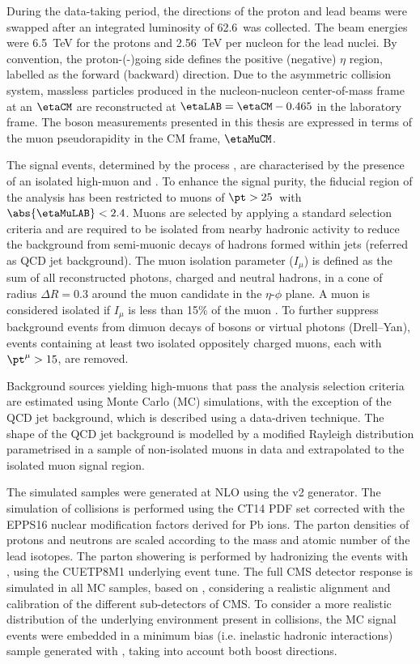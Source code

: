 During the data-taking period, the directions of the proton and lead beams were swapped after an integrated luminosity of 62.6~\nbinv was collected. The beam energies were \SI{6.5}{\TeV} for the protons and \SI{2.56}{\TeV} per nucleon for the lead nuclei. By convention, the proton-(\Pb-)going side defines the positive (negative) $\eta$ region, labelled as the forward (backward) direction. Due to the asymmetric collision system, massless particles produced in the nucleon-nucleon center-of-mass frame at an $\etaCM$ are reconstructed at $\etaLAB = \etaCM - 0.465$ in the laboratory frame. The {\PWpm} boson measurements presented in this thesis are expressed in terms of the muon pseudorapidity in the CM frame, $\etaMuCM$.

The signal events, determined by the process \WToMuNupm, are characterised by the presence of an isolated high-\pt muon and \ptmiss. To enhance the signal purity, the fiducial region of the analysis has been restricted to muons of $\pt > 25$~\GeVc with $\abs{\etaMuLAB} < 2.4$. Muons are selected by applying a standard selection criteria and are required to be isolated from nearby hadronic activity to reduce the background from semi-muonic decays of hadrons formed within jets (referred as QCD jet background). The muon isolation parameter ($I_{\mu}$) is defined as the \pt sum of all reconstructed photons, charged and neutral hadrons, in a cone of radius $\Delta{R} = 0.3$ around the muon candidate in the $\eta$-$\phi$ plane. A muon is considered isolated if $I_{\mu}$ is less than 15\% of the muon \pt. To further suppress background events from dimuon decays of \Z bosons or virtual photons (Drell--Yan), events containing at least two isolated oppositely charged muons, each with $\pt^{\mu} > 15$\GeVc, are removed.

Background sources yielding high-\pt muons that pass the analysis selection criteria are estimated using Monte Carlo (MC) simulations, with the exception of the QCD jet background, which is described using a  data-driven technique. The \ptmiss shape of the QCD jet background is modelled by a modified Rayleigh distribution parametrised in a sample of non-isolated muons in data and extrapolated to the isolated muon signal region.

The simulated samples were generated at NLO using the \POWHEG v2 generator. The simulation of \pPb collisions is performed using the CT14 PDF set corrected with the EPPS16 nuclear modification factors derived for Pb ions. The parton densities of protons and neutrons are scaled according to the mass and atomic number of the lead isotopes. The parton showering is performed by hadronizing the \POWHEG events with , using the CUETP8M1 underlying event tune. The full CMS detector response is simulated in all MC samples, based on \GEANTfour, considering a realistic alignment and calibration of the different sub-detectors of CMS. To consider a more realistic distribution of the underlying environment present in \RunpPb collisions, the MC signal events were embedded in a minimum bias (i.e. inelastic hadronic interactions) sample generated with \EPOSLHC, taking into account both \RunpPb boost directions.

